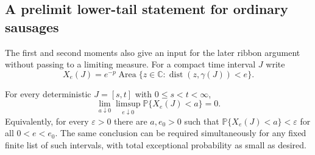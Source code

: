 \subsection{A prelimit lower-tail statement for ordinary sausages}

The first and second moments also give an input for the later ribbon
argument without passing to a limiting measure.  For a compact time
interval $J$ write
\[
 X_e(J)=e^{-p}\operatorname{Area}
  \{z\in\mathbb C:\operatorname{dist}(z,\gamma(J))<e\}.
\]

\begin{proposition}
\label{retain:sausage}
For every deterministic $J=[s,t]$ with $0\le s<t<\infty$,
\begin{equation}
 \lim_{a\downarrow0}\limsup_{e\downarrow0}
 \mathbb P\{X_e(J)<a\}=0.
 \label{retain:sausage-tail}
\end{equation}
Equivalently, for every $\varepsilon>0$ there are $a,e_0>0$ such
that $\mathbb P\{X_e(J)<a\}<\varepsilon$ for all $0<e<e_0$.
The same conclusion can be required simultaneously for any fixed
finite list of such intervals, with total exceptional probability
as small as desired.
\end{proposition}

